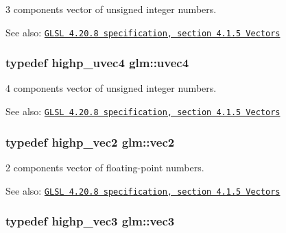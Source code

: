 3 components vector of unsigned integer numbers.

\begin{Desc}
\item[See also:]\href{http://www.opengl.org/registry/doc/GLSLangSpec.4.20.8.pdf}{\tt GLSL 4.20.8 specification, section 4.1.5 Vectors} \end{Desc}
\hypertarget{group__core__types_g1c426d19627b32b14f0089f7f4ba7b1d}{
\subsubsection[uvec4]{\setlength{\rightskip}{0pt plus 5cm}typedef highp\_\-uvec4 {\bf glm::uvec4}}}
\label{group__core__types_g1c426d19627b32b14f0089f7f4ba7b1d}


4 components vector of unsigned integer numbers.

\begin{Desc}
\item[See also:]\href{http://www.opengl.org/registry/doc/GLSLangSpec.4.20.8.pdf}{\tt GLSL 4.20.8 specification, section 4.1.5 Vectors} \end{Desc}
\hypertarget{group__core__types_ga1618f51db67eaa145db101d8c8431d8}{
\subsubsection[vec2]{\setlength{\rightskip}{0pt plus 5cm}typedef highp\_\-vec2 {\bf glm::vec2}}}
\label{group__core__types_ga1618f51db67eaa145db101d8c8431d8}


2 components vector of floating-point numbers.

\begin{Desc}
\item[See also:]\href{http://www.opengl.org/registry/doc/GLSLangSpec.4.20.8.pdf}{\tt GLSL 4.20.8 specification, section 4.1.5 Vectors} \end{Desc}
\hypertarget{group__core__types_g1c47e8b3386109bc992b6c48e91b0be7}{
\subsubsection[vec3]{\setlength{\rightskip}{0pt plus 5cm}typedef highp\_\-vec3 {\bf glm::vec3}}}
\label{group__core__types_g1c47e8b3386109bc992b6c48e91b0be7}


